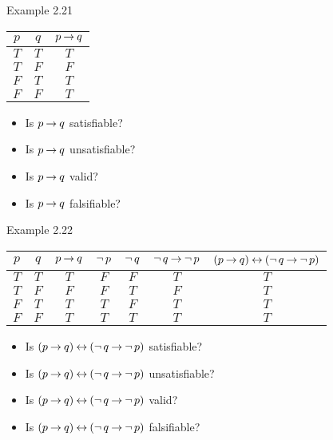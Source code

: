 \begin{wideslide}[bm=,toc=]{Example 2.21}
\begin{center}
\begin{tabular}{|c|c||c|}
\hline
$p$ & $q$ & $p \mathbin{\rightarrow} q$ \\ \hline \hline
$T$ & $T$ & $T$  \\ \hline
$T$ & $F$ & $F$  \\ \hline
$F$ & $T$ & $T$  \\ \hline
$F$ & $F$ & $T$  \\ \hline
\end{tabular}
\end{center}
\begin{itemize}
\item Is $p \mathbin{\rightarrow} q$ satisfiable?
\item Is $p \mathbin{\rightarrow} q$ unsatisfiable?
\item Is $p \mathbin{\rightarrow} q$ valid?
\item Is $p \mathbin{\rightarrow} q$ falsifiable?
\end{itemize}
\end{wideslide}

\begin{wideslide}[bm=,toc=]{Example 2.22}
\begin{center}
\begin{tabular}{|c|c||c|c|c|c|c|}
\hline
$p$ & $q$ & $p \mathbin{\rightarrow} q$ & $\mathop{\neg} p$ & $\mathop{\neg} q$ 
& $\mathop{\neg} q \mathbin{\rightarrow} \mathop{\neg} p$ & $(p\mathbin{\rightarrow} q)\mathbin{\leftrightarrow}  (\mathop{\neg} q\mathbin{\rightarrow} \mathop{\neg} p)$\\ \hline \hline
$T$ & $T$ & $T$  & $F$ & $F$  & $T$ & $T$  \\ \hline
$T$ & $F$ & $F$ & $F$ & $T$  & $F$ & $T$   \\ \hline
$F$ & $T$ & $T$ & $T$ & $F$  & $T$ & $T$   \\ \hline
$F$ & $F$ & $T$ & $T$ & $T$  & $T$ & $T$   \\ \hline
\end{tabular}
\end{center}
\begin{itemize}
\item Is $(p\mathbin{\rightarrow} q)\mathbin{\leftrightarrow}  (\mathop{\neg} q\mathbin{\rightarrow} \mathop{\neg} p)$ satisfiable?
\item Is $(p\mathbin{\rightarrow} q)\mathbin{\leftrightarrow}  (\mathop{\neg} q\mathbin{\rightarrow} \mathop{\neg} p)$ unsatisfiable?
\item Is $(p\mathbin{\rightarrow} q)\mathbin{\leftrightarrow}  (\mathop{\neg} q\mathbin{\rightarrow} \mathop{\neg} p)$ valid?
\item Is $(p\mathbin{\rightarrow} q)\mathbin{\leftrightarrow}  (\mathop{\neg} q\mathbin{\rightarrow} \mathop{\neg} p)$ falsifiable?
\end{itemize}
\end{wideslide}

